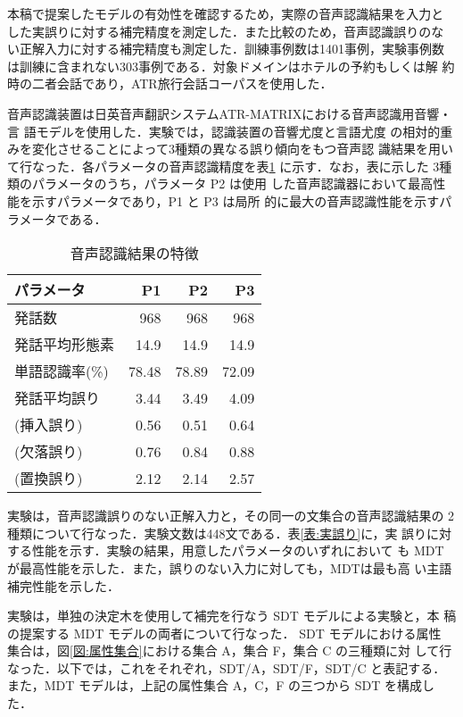 本稿で提案したモデルの有効性を確認するため，実際の音声認識結果を入力と
した実誤りに対する補完精度を測定した．また比較のため，音声認識誤りのな
い正解入力に対する補完精度も測定した．訓練事例数は1401事例，実験事例数
は訓練に含まれない303事例である．対象ドメインはホテルの予約もしくは解
約時の二者会話であり，ATR旅行会話コーパス\cite{Takezawa98}を使用した．

音声認識装置は日英音声翻訳システムATR-MATRIXにおける音声認識用音響・言
語モデル\cite{内藤}を使用した．実験では，認識装置の音響尤度と言語尤度
の相対的重みを変化させることによって3種類の異なる誤り傾向をもつ音声認
識結果を用いて行なった．各パラメータの音声認識精度を表\ref{表:認識器}
に示す．なお，表に示した 3種類のパラメータのうち，パラメータ P2 は使用
した音声認識器において最高性能を示すパラメータであり，P1 と P3 は局所
的に最大の音声認識性能を示すパラメータである．


\begin{table}
\begin{center}
\caption{音声認識結果の特徴}
\label{表:認識器}
\begin{tabular}{l|rrr}
\hline\hline
パラメータ      &  P1  &  P2 & P3 \\
\hline
発話数          &  968  &  968  &  968 \\
発話平均形態素  & 14.9  & 14.9  & 14.9 \\
単語認識率(\%)  & 78.48 & 78.89 & 72.09 \\
\hline
発話平均誤り     & 3.44 & 3.49 & 4.09 \\
(挿入誤り) & 0.56 & 0.51 & 0.64 \\
(欠落誤り) & 0.76 & 0.84 & 0.88 \\
(置換誤り) & 2.12 & 2.14 & 2.57 \\
\hline
\end{tabular}
\end{center}
\end{table}


実験は，音声認識誤りのない正解入力と，その同一の文集合の音声認識結果の
2種類について行なった．実験文数は448文である．表\ref{表:実誤り}に，実
誤りに対する性能を示す．実験の結果，用意したパラメータのいずれにおいて
も MDT が最高性能を示した．また，誤りのない入力に対しても，MDTは最も高
い主語補完性能を示した．

実験は，単独の決定木を使用して補完を行なう SDT モデルによる実験と，本
稿の提案する MDT モデルの両者について行なった． SDT モデルにおける属性
集合は，図\ref{図:属性集合}における集合 A，集合 F，集合 C の三種類に対
して行なった．以下では，これをそれぞれ，SDT/A，SDT/F，SDT/C と表記する．
また，MDT モデルは，上記の属性集合 A，C，F の三つから SDT を構成した．



